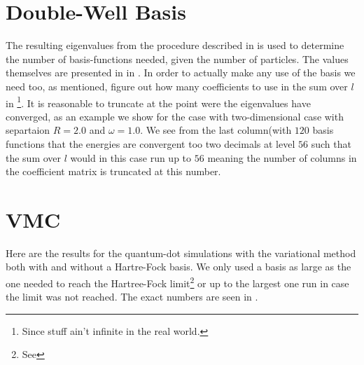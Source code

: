 \section{Double-Well Basis\label{sec:dwbimp}}
    The resulting eigenvalues from the procedure described in 
    is used to determine the number of basis-functions needed, given the number
    of particles. The values themselves are presented in  in
    . In order to actually make any use of the basis we need
    too, as mentioned, figure out how many coefficients to use in the sum over
    $l$ in \footnote{Since stuff ain't infinite in the
    real world.}. It is reasonable to truncate at the point were the
    eigenvalues have converged, as an example we show  for the
    case with two-dimensional case with separtaion $R=2.0$ and $\omega=1.0$. We
    see from the last column(with $120$ basis functions that the energies are
    convergent too two decimals at level $56$ such that the sum over $l$ would
    in this case run up to $56$ meaning the number of columns in the
    coefficient matrix is truncated at this number.

\section{VMC}
    Here are the results for the quantum-dot simulations with the variational
    method both with and without a Hartre-Fock basis. We only used a basis as
    large as the one needed to reach the Hartree-Fock limit\footnote{See
    } or up to the largest one run in case the limit was not
    reached. The exact numbers are seen in .
